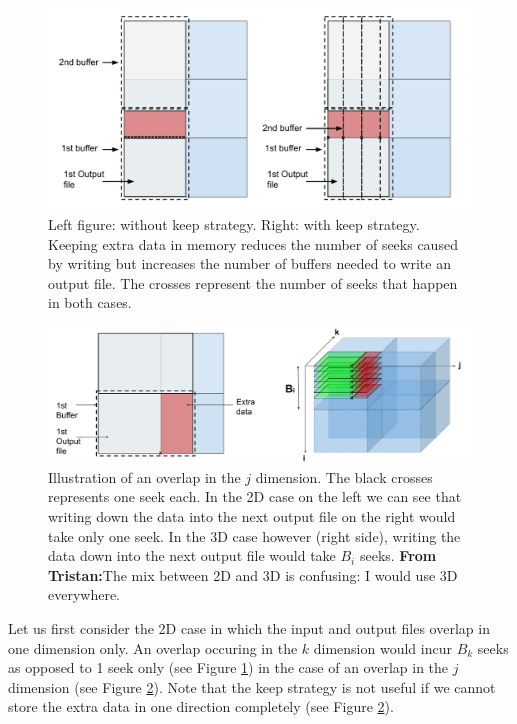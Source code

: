 \documentclass[conference]{IEEEtran}
\newcommand{\tristan}[1]{\color{orange}\textbf{From Tristan:}#1\color{black}}
\begin{document}
\begin{figure}[h]
\centering
\includegraphics[scale=0.20]{./figures/case_1_2.png}
\caption{Left figure: without keep strategy.
Right: with keep strategy.
Keeping extra data in memory reduces the number of seeks caused by writing but increases the number of buffers needed to write an output file.
The crosses represent the number of seeks that happen in both cases.
}
\label{fig:case_1_2}
\end{figure}

\begin{figure}[h]
\centering
\includegraphics[scale=0.20]{./figures/case_2_1.png}
\caption{Illustration of an overlap in the $j$ dimension. The black crosses
represents one seek each. In the 2D case on the left we can see that
writing down the data into the next output file on the right would take
only one seek. In the 3D case however (right side), writing the data down
into the next output file would take $B_i$ seeks. \tristan{The mix between
2D and 3D is confusing: I would use 3D everywhere.}
}
\label{fig:case_2_1}
\end{figure}

Let us first consider the 2D case in which the input and output files overlap in one dimension only.
An overlap occuring in the $k$ dimension would incur $B_k$ seeks as opposed to 1 seek only (see Figure \ref{fig:case_1_2}) in the case of an overlap in the $j$ dimension (see Figure \ref{fig:case_2_1}).
Note that the keep strategy is not useful if we cannot store the extra data in one direction completely (see Figure \ref{fig:case_2_1}). \\
\end{document}
